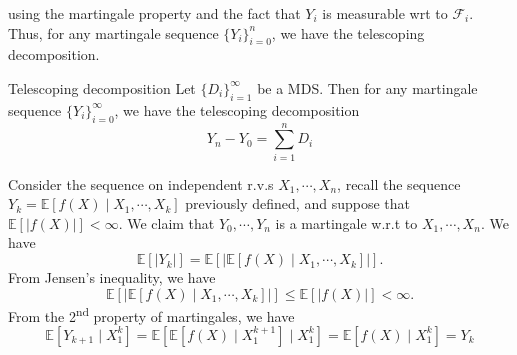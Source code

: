 \documentclass[10pt,handout,english]{beamer}
\newcommand{\ts}{\textsuperscript}
\newcommand{\E}{\mathbb{E}}
\newcommand{\F}{\mathcal{F}}
\begin{document}
\begin{frame}[allowframebreaks]
using the martingale property and the fact that $Y_i$ is measurable wrt to $\F_i$. Thus, for any martingale sequence $\{Y_i\}_{i=0}^{n}$, we have the telescoping decomposition.
\begin{block}{Telescoping decomposition}
Let $\{D_i\}_{i=1}^{\infty}$ be a MDS. Then for any martingale sequence $\{Y_i\}_{i=0}^{\infty}$, we have the telescoping decomposition
\[
Y_n-Y_0=\sum\limits_{i=1}^{n}D_i
\]
\end{block} 
\begin{example}
Consider the sequence on independent r.v.s $X_1,\cdots,X_n$, recall the sequence $Y_{k}=\E[f(X)\mid X_1,\cdots,X_k]$ previously defined, and suppose that $\E[\lvert f(X) \rvert]<\infty$. We claim that $Y_0,\cdots,Y_n$ is a martingale w.r.t to $X_1,\cdots,X_n$. We have
\[
\E[\lvert Y_k\rvert]=\E[\lvert\E[f(X)\mid X_1,\cdots,X_k]\rvert].
\] 
From Jensen's inequality, we have 
\[
\E[\lvert\E[f(X)\mid X_1,\cdots,X_k]\rvert]\leq\E[\lvert f(X)\rvert]<\infty.
\] 
From the 2\ts{nd} property of martingales, we have
\[ 
\E[Y_{k+1}\mid X_{1}^k]=\E[\E[f(X)\mid X_{1}^{k+1}]\mid X_{1}^{k}]=\E[f(X)\mid X_{1}^{k}]=Y_k
\]
\end{example}
\end{frame}
\end{document}

